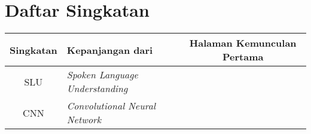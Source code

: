 \chapter*{Daftar Singkatan}

\begin{table}[H]
    \centering
	\begin{tabularx}{\textwidth}{cXc}
        \textbf{Singkatan} & \textbf{Kepanjangan dari} & \textbf{Halaman Kemunculan Pertama} \\ \hline
        SLU & \textit{Spoken Language Understanding} & \pageref{abb:slu} \\
        CNN & \textit{Convolutional Neural Network}  & \pageref{abb:cnn}
	\end{tabularx}
\end{table}